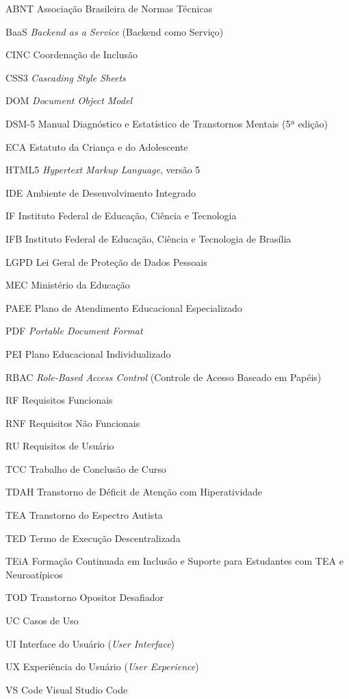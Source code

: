 
\begin{siglas}
    \item[ABNT] Associação Brasileira de Normas Técnicas
    \item[BaaS] \textit{Backend as a Service} (Backend como Serviço)
    \item[CINC] Coordenação de Inclusão
    \item[CSS3] \textit{Cascading Style Sheets}
    \item[DOM] \textit{Document Object Model}
    \item[DSM-5] Manual Diagnóstico e Estatístico de Transtornos Mentais (5ª edição)
    \item[ECA] Estatuto da Criança e do Adolescente
    \item[HTML5] \textit{Hypertext Markup Language}, versão 5
    \item[IDE] Ambiente de Desenvolvimento Integrado
    \item[IF] Instituto Federal de Educação, Ciência e Tecnologia
    \item[IFB] Instituto Federal de Educação, Ciência e Tecnologia de Brasília
    \item[LGPD] Lei Geral de Proteção de Dados Pessoais
    \item[MEC] Ministério da Educação
    \item[PAEE] Plano de Atendimento Educacional Especializado
    \item[PDF] \textit{Portable Document Format}
    \item[PEI] Plano Educacional Individualizado
    \item[RBAC] \textit{Role-Based Access Control} (Controle de Acesso Baseado em Papéis)
    \item[RF] Requisitos Funcionais
    \item[RNF] Requisitos Não Funcionais
    \item[RU] Requisitos de Usuário
    \item[TCC] Trabalho de Conclusão de Curso
    \item[TDAH] Transtorno de Déficit de Atenção com Hiperatividade
    \item[TEA] Transtorno do Espectro Autista
    \item[TED] Termo de Execução Descentralizada
    \item[TEiA] Formação Continuada em Inclusão e Suporte para Estudantes com TEA e Neuroatípicos
    \item[TOD] Transtorno Opositor Desafiador
    \item[UC] Casos de Uso
    \item[UI] Interface do Usuário (\textit{User Interface})
    \item[UX] Experiência do Usuário (\textit{User Experience})
    \item[VS Code] Visual Studio Code
\end{siglas}
